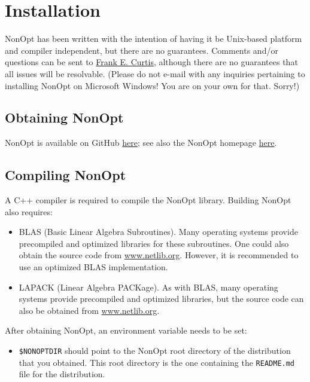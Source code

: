 \documentclass{article}
\begin{document}
\section{Installation}

NonOpt has been written with the intention of having it be Unix-based platform and compiler independent, but there are no guarantees.  Comments and/or questions can be sent to \href{mailto:frank.e.curtis@gmail.com}{Frank E. Curtis}, although there are no guarantees that all issues will be resolvable. (Please do not e-mail with any inquiries pertaining to installing NonOpt on Microsoft Windows! You are on your own for that. Sorry!)

\subsection{Obtaining NonOpt}

NonOpt is available on GitHub \href{https://github.com/frankecurtis/NonOpt}{here}; see also the NonOpt homepage \href{https://frankecurtis.github.io/NonOpt/}{here}.

\subsection{Compiling NonOpt}\label{sec.compiling}

A C++ compiler is required to compile the NonOpt library. Building NonOpt also requires:

\begin{itemize}
  \item BLAS (Basic Linear Algebra Subroutines). Many operating systems provide precompiled and optimized
libraries for these subroutines.  One could also obtain the source code from \href{www.netlib.org}{www.netlib.org}.  However, it is recommended to use an optimized BLAS implementation.
  \item LAPACK (Linear Algebra PACKage).  As with BLAS, many operating systems provide precompiled and optimized libraries, but the source code can also be obtained from \href{www.netlib.org}{www.netlib.org}.
\end{itemize}

After obtaining NonOpt, an environment variable needs to be set:
\begin{itemize}
  \item \texttt{\$NONOPTDIR} should point to the NonOpt root directory of the distribution that you obtained. This root directory is the one containing the \texttt{README.md} file for the distribution.
\end{itemize}
\end{document}
